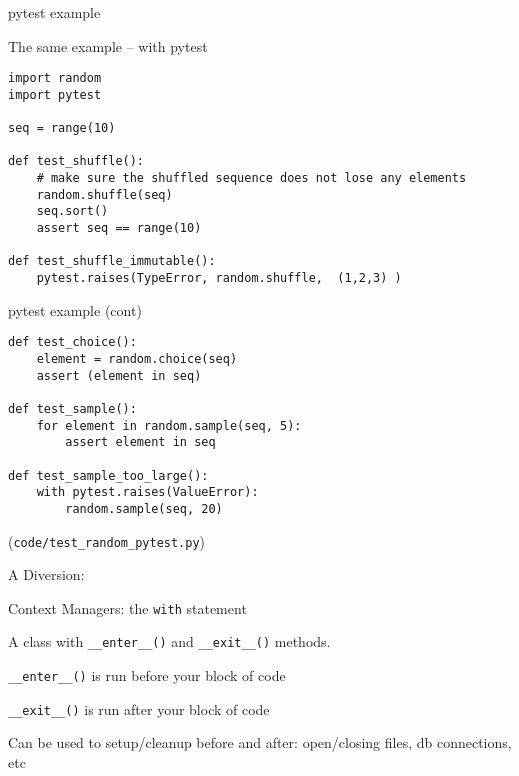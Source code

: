 \documentclass{beamer}
\begin{document}
\begin{frame}[fragile]{pytest example}

{\Large The same example -- with pytest}

{\small
\begin{verbatim}
import random
import pytest

seq = range(10)

def test_shuffle():
    # make sure the shuffled sequence does not lose any elements
    random.shuffle(seq)
    seq.sort()
    assert seq == range(10)

def test_shuffle_immutable():
    pytest.raises(TypeError, random.shuffle,  (1,2,3) )
\end{verbatim}
}

\end{frame} 

\begin{frame}[fragile]{pytest example (cont) }

{\small
\begin{verbatim}
def test_choice():
    element = random.choice(seq)
    assert (element in seq)

def test_sample():
    for element in random.sample(seq, 5):
        assert element in seq

def test_sample_too_large():
    with pytest.raises(ValueError):
        random.sample(seq, 20)
\end{verbatim}
}

\vfill
(\verb|code/test_random_pytest.py|)

\end{frame} 

\begin{frame}[fragile]{A Diversion:}

{\LARGE Context Managers:} {\Large the \verb|with| statement}

\vfill
{\Large A class with \verb|__enter__()| and \verb|__exit__()| methods.}
 
\vfill
{\Large \verb|__enter__()| is run before your block of code}

\vfill
{\Large \verb|__exit__()| is run after your block of code}

\vfill
{\Large Can be used to setup/cleanup before and after: open/closing files, db connections, etc}
\end{frame} 
\end{document}

